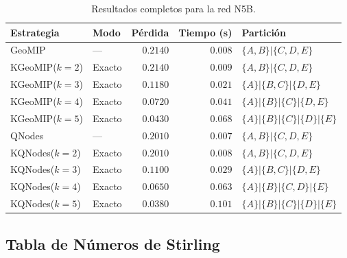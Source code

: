 \begin{table}[H]
    \centering
    \caption{Resultados completos para la red N5B.}
    \label{tab:n5b_full}
    \begin{tabular}{llrrl}
        \toprule
        \textbf{Estrategia} & \textbf{Modo} & \textbf{Pérdida} & \textbf{Tiempo (s)} & \textbf{Partición} \\
        \midrule
        GeoMIP        & ---     & $0.2140$ & $0.008$ & $\{A,B\}|\{C,D,E\}$ \\
        KGeoMIP($k=2$)& Exacto  & $0.2140$ & $0.009$ & $\{A,B\}|\{C,D,E\}$ \\
        KGeoMIP($k=3$)& Exacto  & $0.1180$ & $0.021$ & $\{A\}|\{B,C\}|\{D,E\}$ \\
        KGeoMIP($k=4$)& Exacto  & $0.0720$ & $0.041$ & $\{A\}|\{B\}|\{C\}|\{D,E\}$ \\
        KGeoMIP($k=5$)& Exacto  & $0.0430$ & $0.068$ & $\{A\}|\{B\}|\{C\}|\{D\}|\{E\}$ \\
        QNodes        & ---     & $0.2010$ & $0.007$ & $\{A,B\}|\{C,D,E\}$ \\
        KQNodes($k=2$)& Exacto  & $0.2010$ & $0.008$ & $\{A,B\}|\{C,D,E\}$ \\
        KQNodes($k=3$)& Exacto  & $0.1100$ & $0.029$ & $\{A\}|\{B,C\}|\{D,E\}$ \\
        KQNodes($k=4$)& Exacto  & $0.0650$ & $0.063$ & $\{A\}|\{B\}|\{C,D\}|\{E\}$ \\
        KQNodes($k=5$)& Exacto  & $0.0380$ & $0.101$ & $\{A\}|\{B\}|\{C\}|\{D\}|\{E\}$ \\
        \bottomrule
    \end{tabular}
\end{table}

\subsection{Tabla de Números de Stirling}

